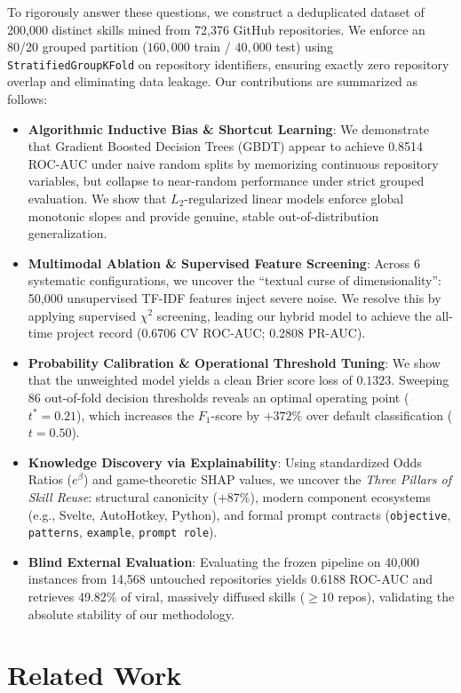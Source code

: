 \documentclass[12pt]{article}
\begin{document}
To rigorously answer these questions, we construct a deduplicated dataset of 200,000 distinct skills mined from 72,376 GitHub repositories. We enforce an 80/20 grouped partition ($160,000$ train / $40,000$ test) using \texttt{StratifiedGroupKFold} on repository identifiers, ensuring exactly zero repository overlap and eliminating data leakage. Our contributions are summarized as follows:
\begin{itemize}
    \item \textbf{Algorithmic Inductive Bias \& Shortcut Learning}: We demonstrate that Gradient Boosted Decision Trees (GBDT) appear to achieve 0.8514 ROC-AUC under naive random splits by memorizing continuous repository variables, but collapse to near-random performance under strict grouped evaluation. We show that $L_2$-regularized linear models enforce global monotonic slopes and provide genuine, stable out-of-distribution generalization.
    \item \textbf{Multimodal Ablation \& Supervised Feature Screening}: Across 6 systematic configurations, we uncover the ``textual curse of dimensionality'': 50,000 unsupervised TF-IDF features inject severe noise. We resolve this by applying supervised $\chi^2$ screening, leading our hybrid model to achieve the all-time project record (0.6706 CV ROC-AUC; 0.2808 PR-AUC).
    \item \textbf{Probability Calibration \& Operational Threshold Tuning}: We show that the unweighted model yields a clean Brier score loss of $0.1323$. Sweeping 86 out-of-fold decision thresholds reveals an optimal operating point ($t^* = 0.21$), which increases the $F_1$-score by $+372\%$ over default classification ($t=0.50$).
    \item \textbf{Knowledge Discovery via Explainability}: Using standardized Odds Ratios ($e^\beta$) and game-theoretic SHAP values, we uncover the \emph{Three Pillars of Skill Reuse}: structural canonicity ($+87\%$), modern component ecosystems (e.g., Svelte, AutoHotkey, Python), and formal prompt contracts (\texttt{objective}, \texttt{patterns}, \texttt{example}, \texttt{prompt role}).
    \item \textbf{Blind External Evaluation}: Evaluating the frozen pipeline on 40,000 instances from 14,568 untouched repositories yields 0.6188 ROC-AUC and retrieves 49.82\% of viral, massively diffused skills ($\ge 10$ repos), validating the absolute stability of our methodology.
\end{itemize}

\section{Related Work}
\end{document}

